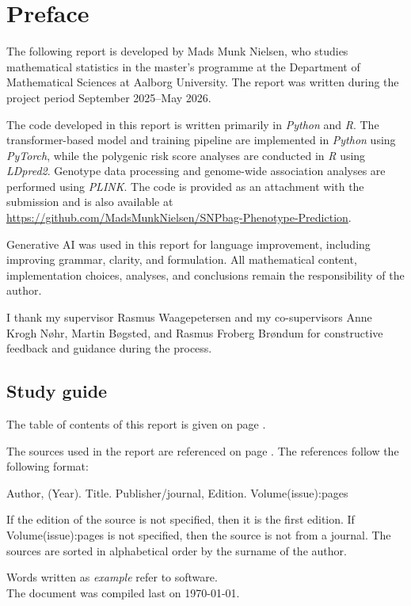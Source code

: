 \chapter{Preface}
\thispagestyle{plain}

The following report is developed by Mads Munk Nielsen, who studies mathematical statistics in the master's programme at the Department of Mathematical Sciences at Aalborg University. The report was written during the project period September 2025--May 2026.

The code developed in this report is written primarily in \textit{Python} and \textit{R}. The transformer-based model and training pipeline are implemented in \textit{Python} using \textit{PyTorch}, while the polygenic risk score analyses are conducted in \textit{R} using \textit{LDpred2}. Genotype data processing and genome-wide association analyses are performed using \textit{PLINK}. The code is provided as an attachment with the submission and is also available at \url{https://github.com/MadsMunkNielsen/SNPbag-Phenotype-Prediction}.

Generative AI was used in this report for language improvement, including improving grammar, clarity, and formulation. All mathematical content, implementation choices, analyses, and conclusions remain the responsibility of the author.

I thank my supervisor Rasmus Waagepetersen and my co-supervisors Anne Krogh N{\o}hr, Martin B{\o}gsted, and Rasmus Froberg Br{\o}ndum for constructive feedback and guidance during the process.

\section*{Study guide}
The table of contents of this report is given on page \pageref{page:toc}.

The sources used in the report are referenced on page \pageref{bib}. The references follow the following format:

\begin{center}
Author, (Year). Title. Publisher/journal, Edition. Volume(issue):pages
\end{center}

If the edition of the source is not specified, then it is the first edition. If Volume(issue):pages is not specified, then the source is not from a journal. The sources are sorted in alphabetical order by the surname of the author.

Words written as \textit{example} refer to software.\\

\noindent The document was compiled last on \today.